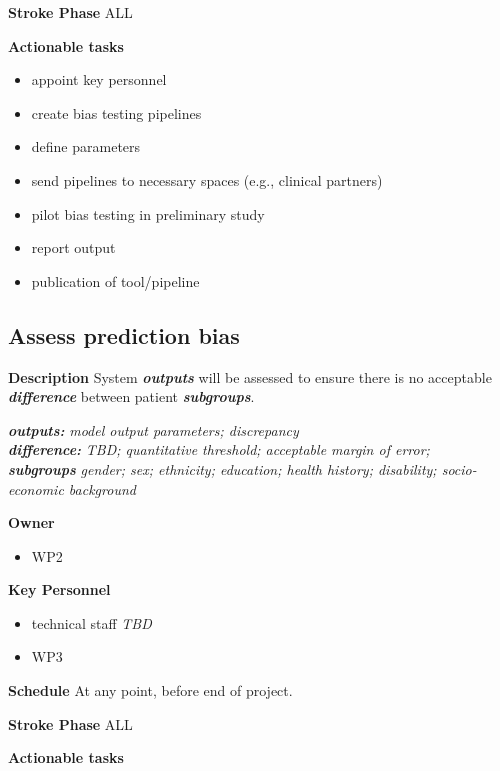 \documentclass[
  letterpaper,
  DIV=11,
  numbers=noendperiod]{scrreport}
\providecommand{\tightlist}{%
  \setlength{\itemsep}{0pt}\setlength{\parskip}{0pt}}\usepackage{longtable,booktabs,array}
\begin{document}
\textbf{Stroke Phase} ALL

\textbf{Actionable tasks}

\begin{itemize}
\tightlist
\item
  appoint key personnel
\item
  create bias testing pipelines
\item
  define parameters
\item
  send pipelines to necessary spaces (e.g., clinical partners)
\item
  pilot bias testing in preliminary study
\item
  report output
\item
  publication of tool/pipeline
\end{itemize}

\hypertarget{assess-prediction-bias}{%
\subsection{Assess prediction bias}\label{assess-prediction-bias}}

\textbf{Description} System \textbf{\emph{outputs}} will be assessed to
ensure there is no acceptable \textbf{\emph{difference}} between patient
\textbf{\emph{subgroups}}.

\textbf{\emph{outputs:}} \emph{model output parameters; discrepancy}\\
\textbf{\emph{difference:}} \emph{TBD; quantitative threshold;
acceptable margin of error;}\\
\textbf{\emph{subgroups}} \emph{gender; sex; ethnicity; education;
health history; disability; socio-economic background}

\textbf{Owner}

\begin{itemize}
\tightlist
\item
  WP2
\end{itemize}

\textbf{Key Personnel}

\begin{itemize}
\tightlist
\item
  technical staff \emph{TBD}
\item
  WP3
\end{itemize}

\textbf{Schedule} At any point, before end of project.

\textbf{Stroke Phase} ALL

\textbf{Actionable tasks}
\end{document}
